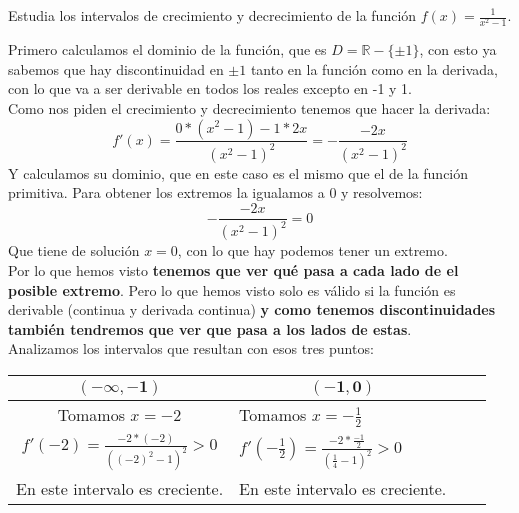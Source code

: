 \documentclass[a4paper,11pt,answers]{exam}
\newcommand\ddfrac[2]{\frac{\displaystyle #1}{\displaystyle #2}}
\begin{document}
\begin{questions}
\question Estudia los intervalos de crecimiento y decrecimiento de la función $f(x) = \frac{1}{x^2 - 1}$.
\begin{solution}
Primero calculamos el dominio de la función, que es $D=\mathbb{R}-\{\pm1\}$, con esto ya sabemos que hay discontinuidad en $\pm 1$ tanto en la función como en la derivada, con lo que va a ser derivable en todos los reales excepto en -1 y 1.\\
Como nos piden el crecimiento y decrecimiento tenemos que hacer la derivada:
\[f'(x) = \frac{0*(x^2 -1) - 1*2x}{(x^2 - 1)^2} = -\frac{-2x}{(x^2 - 1)^2}\]
Y calculamos su dominio, que en este caso es el mismo que el de la función primitiva.
Para obtener los extremos la igualamos a 0 y resolvemos:
\[-\frac{-2x}{(x^2 - 1)^2} = 0\]
Que tiene de solución $x=0$, con lo que hay podemos tener un extremo.\\

Por lo que hemos visto \textbf{tenemos que ver qué pasa a cada lado de el posible extremo}. Pero lo que hemos visto solo es válido si la función es derivable (continua y derivada continua) \textbf{y como tenemos discontinuidades también tendremos que ver que pasa a los lados de estas}.\\

Analizamos los intervalos que resultan con esos tres puntos:
\begin{small}
\begin{center}
\begin{tabular}{|Sl|Sl|} %
\hline
{} &                                                                                     \\ \hline
Tomamos $x=-2$&Tomamos $x=-\frac{1}{2}$\\
$f'(-2) =\frac{-2*(-2)}{((-2)^2 - 1)^2}>0$ & $f'(-\frac{1}{2}) =\ddfrac{-2*\frac{-1}{2}}{ \left(\frac{1}{4} - 1 \right)^2} > 0$\\
En este intervalo es creciente.& En este intervalo es creciente.\\
\hline
\end{tabular}


\end{center}
\end{small}
\end{solution}
\end{questions}
\end{document}
